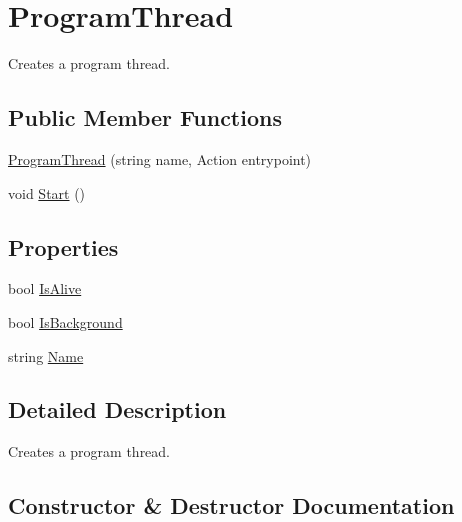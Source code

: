 \hypertarget{classOTA_1_1Misc_1_1ProgramThread}{}\section{Program\+Thread}
\label{classOTA_1_1Misc_1_1ProgramThread}


Creates a program thread.  


\subsection*{Public Member Functions}
\begin{DoxyCompactItemize}
\item 
\hyperlink{classOTA_1_1Misc_1_1ProgramThread_a45f9d3018c5383316b9842b414e21521}{Program\+Thread} (string name, Action entrypoint)
\item 
void \hyperlink{classOTA_1_1Misc_1_1ProgramThread_a07aaf1227e4d645f15e0a964f54ef291}{Start} ()
\end{DoxyCompactItemize}
\subsection*{Properties}
\begin{DoxyCompactItemize}
\item 
bool \hyperlink{classOTA_1_1Misc_1_1ProgramThread_a2bdb54e111b7cfeed1d46b5a7ef64dbf}{Is\+Alive}
\item 
bool \hyperlink{classOTA_1_1Misc_1_1ProgramThread_a198cc36e04a46019b4b374c308a4276a}{Is\+Background}
\item 
string \hyperlink{classOTA_1_1Misc_1_1ProgramThread_a7ee9065718e6628dc7791b756fa6c0f9}{Name}
\end{DoxyCompactItemize}


\subsection{Detailed Description}
Creates a program thread. 



\subsection{Constructor \& Destructor Documentation}
\hypertarget{classOTA_1_1Misc_1_1ProgramThread_a45f9d3018c5383316b9842b414e21521}{}
